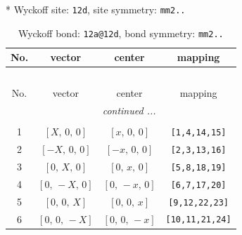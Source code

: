 \documentclass[fleqn,8pt]{jsarticle}
\begin{document}
* Wyckoff site: {\tt 12d}, site symmetry: {\tt mm2..}
\renewcommand{\arraystretch}{1.2}
\begin{longtable}{cccc}
\caption{Wyckoff bond: {\tt 12a@12d}, bond symmetry: {\tt mm2..}}
 \\
 \hline \hline
No. & vector & center & mapping \\ \hline \endfirsthead

\multicolumn{3}{l}{\tablename\ \thetable{}} \\
 \hline \hline
No. & vector & center & mapping \\ \hline \endhead

 \hline \hline
\multicolumn{3}{r}{\footnotesize\it continued ...} \\ \endfoot

 \hline \hline
\multicolumn{3}{r}{} \\ \endlastfoot

1 & $\left[ X,\, 0,\, 0 \right]$ & $\left[ x,\, 0,\, 0 \right]$ & {\tt [1,4,14,15]} \\ \hline
2 & $\left[ - X,\, 0,\, 0 \right]$ & $\left[ - x,\, 0,\, 0 \right]$ & {\tt [2,3,13,16]} \\ \hline
3 & $\left[ 0,\, X,\, 0 \right]$ & $\left[ 0,\, x,\, 0 \right]$ & {\tt [5,8,18,19]} \\ \hline
4 & $\left[ 0,\, - X,\, 0 \right]$ & $\left[ 0,\, - x,\, 0 \right]$ & {\tt [6,7,17,20]} \\ \hline
5 & $\left[ 0,\, 0,\, X \right]$ & $\left[ 0,\, 0,\, x \right]$ & {\tt [9,12,22,23]} \\ \hline
6 & $\left[ 0,\, 0,\, - X \right]$ & $\left[ 0,\, 0,\, - x \right]$ & {\tt [10,11,21,24]} \\
\end{longtable}
\renewcommand{\arraystretch}{1.2}
\end{document}
